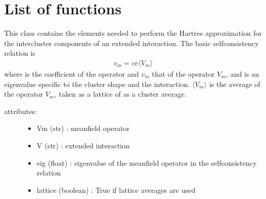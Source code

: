 \documentclass[letterpaper,10pt,english]{sphinxmanual}
\begin{document}
\section{List of functions}
\label{\detokenize{utilities:list-of-functions}}

\begin{fulllineitems}
\label{\detokenize{utilities:pyqcm.hartree.hartree}}
\sphinxAtStartPar
This class contains the elements needed to perform the Hartree approximation for the inter\sphinxhyphen{}cluster components of an
extended interaction. The basic self\sphinxhyphen{}consistency relation is
\begin{equation*}
\begin{split}v_m = ve\langle V_m\rangle    \end{split}
\end{equation*}
\sphinxAtStartPar
where  is the coefficient of the operator  and \(v_m\) that of the operator \(V_m\), and  is an eigenvalue specific to the cluster shape and the interaction. \(\langle V_m\rangle\) is the average of the operator \(V_m\), taken
as a lattice of as a cluster average.
\begin{description}
\item[{attributes:}] \leavevmode\begin{itemize}
\item {} 
\sphinxAtStartPar
Vm (str) : mean\sphinxhyphen{}field operator

\item {} 
\sphinxAtStartPar
V (str) : extended interaction

\item {} 
\sphinxAtStartPar
eig (float) : eigenvalue  of the mean\sphinxhyphen{}field operator in the self\sphinxhyphen{}consistency relation

\item {} 
\sphinxAtStartPar
lattice (boolean) : True if lattice averages are used


\end{itemize}
\end{description}
\end{fulllineitems}
\end{document}
